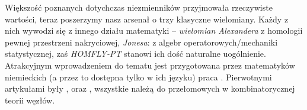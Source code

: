 Większość poznanych dotychczas niezmienników przyjmowała rzeczywiste wartości, teraz poszerzymy nasz arsenał o trzy klasyczne wielomiany.
Każdy z nich wywodzi się z innego działu matematyki -- \emph{wielomian Alexandera} z homologii pewnej przestrzeni nakryciowej, \emph{Jonesa}: z algebr operatorowych/mechaniki statystycznej, zaś \emph{HOMFLY-PT} stanowi ich dość naturalne uogólnienie.
Atrakcyjnym wprowadzeniem do tematu jest przygotowana przez matematyków niemieckich (a przez to dostępna tylko w ich języku) praca \cite{gellert09}.
Pierwotnymi artykułami były \cite{alexander28}, \cite{jones85} oraz \cite{homfly85}, wszystkie należą do przełomowych w kombinatorycznej teorii węzłów.